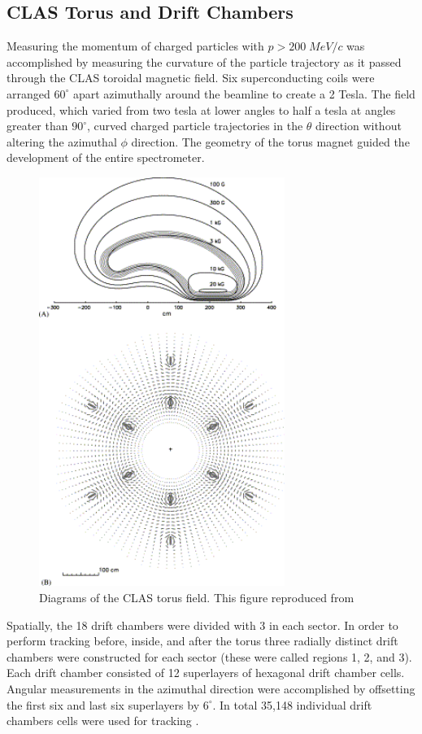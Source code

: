 \subsection{CLAS Torus and Drift Chambers}
Measuring the momentum of charged particles with $p > 200 \; MeV/c$ was accomplished by measuring the curvature of the particle trajectory as it passed through the CLAS toroidal magnetic field.  Six superconducting coils were arranged $60^\circ$ apart azimuthally around the beamline to create a 2 Tesla.  The field produced, which varied from two tesla at lower angles to half a tesla at angles greater than $90^\circ$, curved charged particle trajectories in the $\theta$ direction without altering the azimuthal $\phi$ direction.  The geometry of the torus magnet guided the development of the entire spectrometer.  \\

\begin{figure}
	\centering
		\includegraphics[width=8cm]{image/diagrams/torus-field.png}
		\caption{Diagrams of the CLAS torus field.  This figure reproduced from \cite{hardware-adams:2001}}
\end{figure}

Spatially, the 18 drift chambers were divided with 3 in each sector.  In order to perform tracking before, inside, and after the torus three radially distinct drift chambers were constructed for each sector (these were called regions 1, 2, and 3).  Each drift chamber consisted of 12 superlayers of hexagonal drift chamber cells.  Angular measurements in the azimuthal direction were accomplished by offsetting the first six and last six superlayers by $6^\circ$.  In total 35,148 individual drift chambers cells were used for tracking \cite{hardware-mestayer:2000}.

